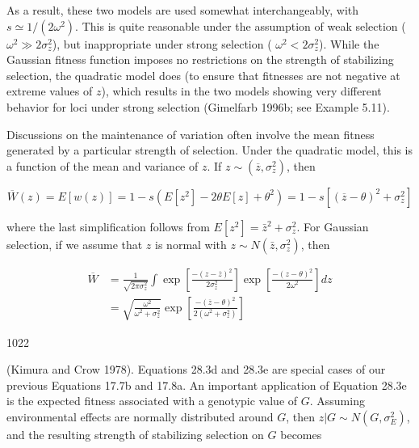 \documentclass{article}
\begin{document}
As a result, these two models are used somewhat interchangeably, with  $ s \simeq 1/(2\omega^2) $. This is quite reasonable under the assumption of weak selection ( $ \omega^2 \gg 2\sigma_z^2 $), but inappropriate under strong selection ( $ \omega^2 < 2\sigma_z^2 $). While the Gaussian fitness function imposes no restrictions on the strength of stabilizing selection, the quadratic model does (to ensure that fitnesses are not negative at extreme values of  $ z $), which results in the two models showing very different behavior for loci under strong selection (Gimelfarb 1996b; see Example 5.11).

Discussions on the maintenance of variation often involve the mean fitness generated by a particular strength of selection. Under the quadratic model, this is a function of the mean and variance of  $ z $. If  $ z \sim (\overline{z}, \sigma_{z}^{2}) $, then

\begin{equation}
\overline{W}(z)=E[w(z)]=1-s\left(E[z^{2}]-2\theta E[z]+\theta^{2}\right)=1-s\left[(\overline{z}-\theta)^{2}+\sigma_{z}^{2}\right]
\tag{28.3d}
\label{eq:28_3d}
\end{equation}

where the last simplification follows from  $ E[z^2] = \bar{z}^2 + \sigma_z^2 $. For Gaussian selection, if we assume that  $ z $ is normal with  $ z \sim N(\bar{z}, \sigma_z^2) $, then

\begin{equation}
\begin{aligned}\overline{W}&=\frac{1}{\sqrt{2\pi\sigma_{z}^{2}}}\int\exp\left[\frac{-\left(z-\overline{z}\right)^{2}}{2\sigma_{z}^{2}}\right]\exp\left[\frac{-\left(z-\theta\right)^{2}}{2\omega^{2}}\right]dz\\&=\sqrt{\frac{\omega^{2}}{\omega^{2}+\sigma_{z}^{2}}}\exp\left[\frac{-\left(\overline{z}-\theta\right)^{2}}{2\left(\omega^{2}+\sigma_{z}^{2}\right)}\right]\end{aligned}
\tag{28.3e}
\label{eq:28_3e}
\end{equation}

1022

(Kimura and Crow 1978). Equations 28.3d and 28.3e are special cases of our previous Equations 17.7b and 17.8a. An important application of Equation 28.3e is the expected fitness associated with a genotypic value of  $ G $. Assuming environmental effects are normally distributed around  $ G $, then  $ z|G \sim N(G, \sigma_E^2) $, and the resulting strength of stabilizing selection on  $ G $ becomes
\end{document}
